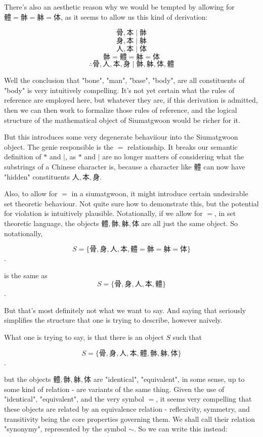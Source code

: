 There's also an aesthetic reason why we would be tempted by allowing for $\text{體} = \text{骵} = \text{躰} = \text{体}$, as it seems to allow us this kind of derivation: 

$$\text{骨}, \text{本} \mid \text{骵}$$
$$\text{身}, \text{本} \mid \text{躰}$$
$$\text{人}, \text{本} \mid \text{体}$$
$$\text{骵} = \text{體} = \text{躰} = \text{体}$$
$$\therefore \text{骨}, \text{人}, \text{本}, \text{身} \mid \text{骵}, \text{躰}, \text{体}, \text{體}$$

Well the conclusion that "bone", "man", "base", "body", are all constituents of "body" is very intuitively compelling. It's not yet certain what the rules of reference are employed here, but whatever they are, if this derivation is admitted, then we can then work to formalize those rules of reference, and the logical structure of the mathematical object of Siumatgwoon would be richer for it. 

But this introduces some very degenerate behaviiour into the Siumatgwoon object. The genie responsible is the $=$ relationship. It breaks our semantic definition of $*$ and $|$, as $*$ and $|$ are no longer matters of considering what the substrings of a Chinese character is, because a character like $\text{體}$ can now have "hidden" constituents $ \text{人}, \text{本}, \text{身}$. 

Also, to allow for $=$ in a siumatgwoon, it might introduce certain undesirable set theoretic behaviour. Not quite sure how to demonstrate this, but the potential for violation is intuitively plausible. Notationally, if we allow for $=$, in set theoretic language, the objects $\text{體}, \text{骵}, \text{躰}, \text{体}$ are all just the same object. So notationally, 

$$S=\{\text{骨}, \text{身}, \text{人}, \text{本}, \text{體} = \text{骵} = \text{躰} = \text{体}\}$$.

is the same as 
$$S=\{\text{骨}, \text{身}, \text{人}, \text{本}, \text{體}\}$$.

But that's most definitely not what we want to say. And saying that seriously simplifies the structure that one is trying to describe, however naively.

What one is trying to say, is that there is an object $S$ such that 

$$S=\{\text{骨}, \text{身}, \text{人}, \text{本}, \text{體} , \text{骵}, \text{躰}, \text{体}\}$$.

but the objects $\text{體} , \text{骵}, \text{躰}, \text{体}$ are "identical", "equivalent", in some sense, up to some kind of relation - are variants of the same thing. Given the use of "identical", "equivalent", and the very symbol $=$, it seems very compelling that these objects are related by an equivalence relation - reflexivity, symmetry, and transitivity being the core properties governing them. We shall call their relation "synonymy", represented by the symbol $\sim$. So we can write this instead: 

